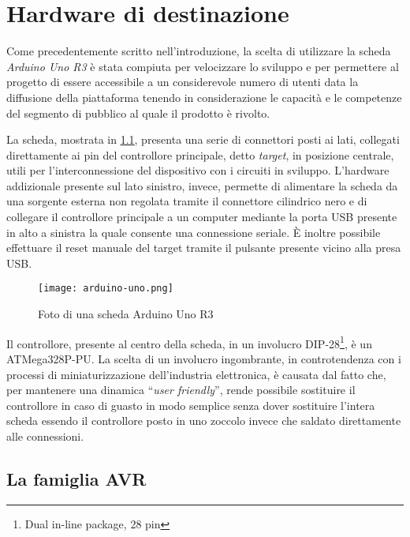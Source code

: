 \chapter{Hardware di destinazione}
    
Come precedentemente scritto nell'introduzione, la scelta di utilizzare la scheda \textit{Arduino Uno R3} è stata compiuta per velocizzare lo sviluppo e per permettere al progetto di essere accessibile a un considerevole numero di utenti data la diffusione della piattaforma tenendo in considerazione le capacità e le competenze del segmento di pubblico al quale il prodotto è rivolto.

La scheda, mostrata in \cref{fig:arduino-uno-r3}, presenta una serie di connettori posti ai lati, collegati direttamente ai pin del controllore principale, detto \textit{target}, in posizione centrale, utili per l'interconnessione del dispositivo con i circuiti in sviluppo.
L'hardware addizionale presente sul lato sinistro, invece, permette di alimentare la scheda da una sorgente esterna non regolata tramite il connettore cilindrico nero e di collegare il controllore principale a un computer mediante la porta USB presente in alto a sinistra la quale consente una connessione seriale.
È inoltre possibile effettuare il reset manuale del target tramite il pulsante presente vicino alla presa USB.\@

\begin{figure}[h]
    \centering
    \texttt{[image: arduino-uno.png]}
    \caption[]{Foto di una scheda Arduino Uno R3\cite{img:arduino-uno-r3}}\label{fig:arduino-uno-r3}
\end{figure}

Il controllore, presente al centro della scheda, in un involucro DIP-28\footnote{Dual in-line package, 28 pin}, è un ATMega328P-PU\cite{site:arduino-uno-doc}. La scelta di un involucro ingombrante, in controtendenza con i processi di miniaturizzazione dell'industria elettronica, è causata dal fatto che, per mantenere una dinamica ``\textit{user friendly}'', rende possibile sostituire il controllore in caso di guasto in modo semplice senza dover sostituire l'intera scheda essendo il controllore posto in uno zoccolo invece che saldato direttamente alle connessioni\cite{site:arduino-uno-doc}.

\section{La famiglia AVR}

